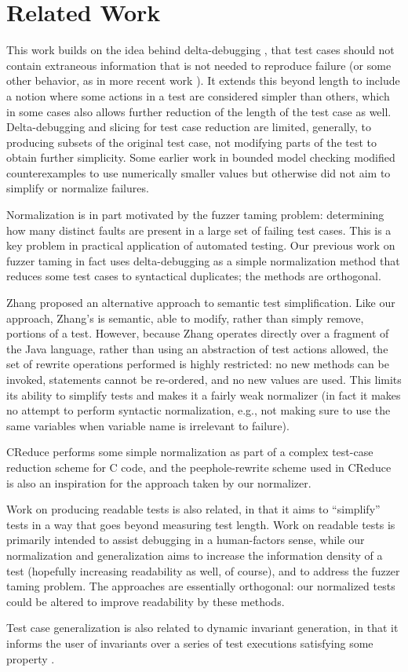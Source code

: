\section{Related Work}

This work builds on the idea behind delta-debugging \cite{DD}, that test cases
should not contain extraneous information that is not needed to
reproduce failure (or some other behavior, as in more recent work \cite{icst2014,stvrcausereduce}).  It extends this beyond length to include a notion
where some actions in a test are considered simpler than others, which
in some cases also allows further reduction of the length of the test
case as well.  Delta-debugging and slicing \cite{TCminim} for test case
reduction are limited, generally, to producing subsets of the original
test case, not modifying parts of the test to obtain further
simplicity.  Some earlier work in bounded model checking modified
counterexamples to use numerically smaller values \cite{MakeMost} but
otherwise did not aim to simplify or normalize failures.

Normalization is in part motivated by the fuzzer taming \cite{PLDI13}
problem:  determining how many distinct faults are present in a large
set of failing test cases.  This is a key problem in practical
application of automated testing.  Our previous work on fuzzer taming
in fact uses delta-debugging as a simple normalization method that
reduces some test cases to syntactical duplicates; the methods are orthogonal.

Zhang \cite{SaiSimple} proposed an alternative approach to semantic
test simplification.  Like our approach, Zhang's is semantic, able to
modify, rather than simply remove, portions of a test.  However,
because Zhang operates directly over a fragment of the Java language,
rather than using an abstraction of test actions allowed, the set of
rewrite operations performed is highly restricted:  no new methods can
be invoked, statements cannot be re-ordered, and no new values are
used.  This limits its ability to simplify tests and makes it a fairly
weak normalizer (in fact it makes no attempt to perform syntactic
normalization, e.g., not making sure to use the same variables when
variable name is irrelevant to failure).

CReduce \cite{CReduce} performs some simple normalization as part of a
complex test-case reduction scheme for C code, and the
peephole-rewrite scheme used in CReduce is also an inspiration for the
approach taken by our normalizer.

Work on producing readable tests \cite{Guava,Readable} is also
related, in that it aims to ``simplify'' tests in a way that goes
beyond measuring test length.  Work on readable tests is primarily
intended to assist debugging in a human-factors sense, while our
normalization and generalization aims to increase the information
density of a test (hopefully increasing readability as well, of
course), and to address the fuzzer taming problem.  The approaches are
essentially orthogonal: our normalized tests could be altered to
improve readability by these methods.

Test case generalization is also related to dynamic invariant
generation, in that it informs the user of invariants over a series of
test executions satisfying some property \cite{Daikon}. 
